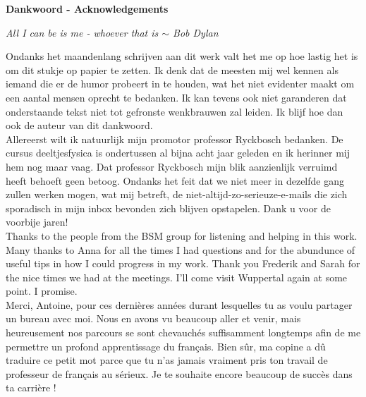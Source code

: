 \clearpage
\thispagestyle{empty}

\begin{huge}
\textbf{Dankwoord - Acknowledgements}\\
\end{huge}
\begin{flushright}
\textit{All I can be is me - whoever that is $\sim$ Bob Dylan
\\}
\end{flushright}

\noindent Ondanks het maandenlang schrijven aan dit werk valt het me op hoe lastig het is om dit stukje op papier te zetten. Ik denk dat de meesten mij wel kennen als iemand die er de humor probeert in te houden, wat het niet evidenter maakt om een aantal mensen oprecht te bedanken. Ik kan tevens ook niet garanderen dat onderstaande tekst niet tot gefronste wenkbrauwen zal leiden. Ik blijf hoe dan ook de auteur van dit dankwoord.\\

\noindent Allereerst wilt ik natuurlijk mijn promotor professor Ryckbosch bedanken. De cursus deeltjesfysica is ondertussen al bijna acht jaar geleden en ik herinner mij hem nog maar vaag. Dat professor Ryckbosch mijn blik aanzienlijk verruimd heeft behoeft geen betoog. Ondanks het feit dat we niet meer in dezelfde gang zullen werken mogen, wat mij betreft, de niet-altijd-zo-serieuze-e-mails die zich sporadisch in mijn inbox bevonden zich blijven opstapelen. Dank u voor de voorbije jaren!\\

\noindent Thanks to the people from the BSM group for listening and helping in this work. Many thanks to Anna for all the times I had questions and for the abundunce of useful tips in how I could progress in my work. Thank you Frederik and Sarah for the nice times we had at the meetings. I'll come visit Wuppertal again at some point. I promise.\\

\noindent Merci, Antoine, pour ces dernières années durant lesquelles tu as voulu partager un bureau avec moi. Nous en avons vu beaucoup aller et venir, mais heureusement nos parcours se sont chevauchés suffisamment longtemps afin de me permettre un profond apprentissage du français. Bien sûr, ma copine a dû traduire ce petit mot parce que tu n'as jamais vraiment pris ton travail de professeur de français au sérieux. Je te souhaite encore beaucoup de succès dans ta carrière !\\

